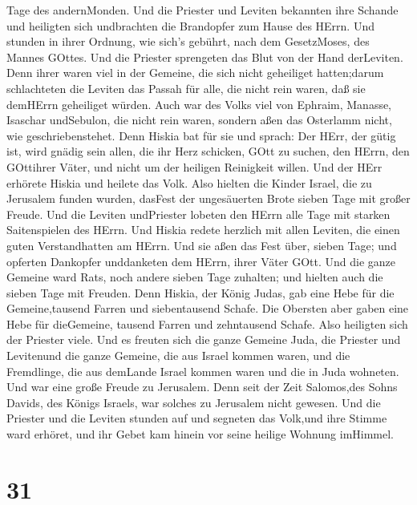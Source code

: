 Tage des andernMonden. Und die Priester und Leviten bekannten ihre
Schande und heiligten sich undbrachten die Brandopfer zum Hause des
HErrn.  Und stunden in ihrer Ordnung, wie sich's gebührt,
nach dem GesetzMoses, des Mannes GOttes. Und die Priester sprengeten das
Blut von der Hand derLeviten.  Denn ihrer waren viel in der
Gemeine, die sich nicht geheiliget hatten;darum schlachteten die Leviten
das Passah für alle, die nicht rein waren, daß sie demHErrn geheiliget
würden.  Auch war des Volks viel von Ephraim, Manasse,
Isaschar undSebulon, die nicht rein waren, sondern aßen das Osterlamm
nicht, wie geschriebenstehet. Denn Hiskia bat für sie und sprach: Der
HErr, der gütig ist, wird gnädig sein  allen, die ihr Herz
schicken, GOtt zu suchen, den HErrn, den GOttihrer Väter, und nicht um
der heiligen Reinigkeit willen.  Und der HErr erhörete
Hiskia und heilete das Volk.  Also hielten die Kinder
Israel, die zu Jerusalem funden wurden, dasFest der ungesäuerten Brote
sieben Tage mit großer Freude. Und die Leviten undPriester lobeten den
HErrn alle Tage mit starken Saitenspielen des HErrn.  Und
Hiskia redete herzlich mit allen Leviten, die einen guten Verstandhatten
am HErrn. Und sie aßen das Fest über, sieben Tage; und opferten
Dankopfer unddanketen dem HErrn, ihrer Väter GOtt.  Und die
ganze Gemeine ward Rats, noch andere sieben Tage zuhalten; und hielten
auch die sieben Tage mit Freuden.  Denn Hiskia, der König
Judas, gab eine Hebe für die Gemeine,tausend Farren und siebentausend
Schafe. Die Obersten aber gaben eine Hebe für dieGemeine, tausend Farren
und zehntausend Schafe. Also heiligten sich der Priester viele.
 Und es freuten sich die ganze Gemeine Juda, die Priester
und Levitenund die ganze Gemeine, die aus Israel kommen waren, und die
Fremdlinge, die aus demLande Israel kommen waren und die in Juda
wohneten.  Und war eine große Freude zu Jerusalem. Denn
seit der Zeit Salomos,des Sohns Davids, des Königs Israels, war solches
zu Jerusalem nicht gewesen.  Und die Priester und die
Leviten stunden auf und segneten das Volk,und ihre Stimme ward erhöret,
und ihr Gebet kam hinein vor seine heilige Wohnung imHimmel.

\hypertarget{section-30}{%
\section{31}\label{section-30}}

